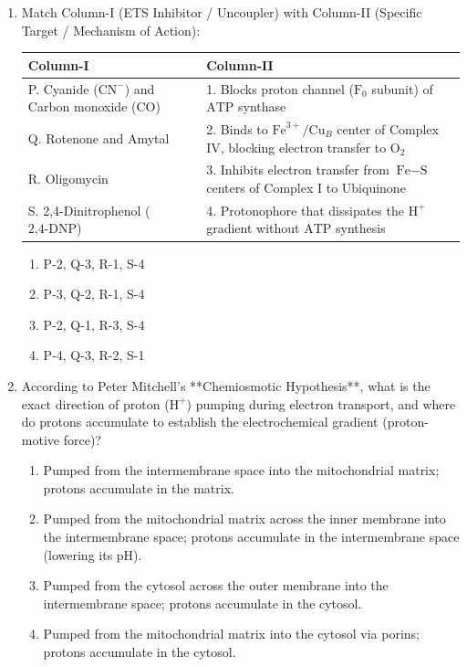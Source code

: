 \documentclass[11pt, a4paper]{article}
\begin{document}
\begin{enumerate}[label=\textbf{\arabic*.}]
\item Match Column-I (ETS Inhibitor / Uncoupler) with Column-II (Specific Target / Mechanism of Action):
\begin{center}
\begin{tabular}{|l|l|}
\hline
\textbf{Column-I} & \textbf{Column-II} \\
\hline
P. Cyanide ($\text{CN}^-$) and Carbon monoxide ($\text{CO}$) & 1. Blocks proton channel ($\text{F}_0$ subunit) of $\text{ATP}$ synthase \\
Q. Rotenone and Amytal & 2. Binds to $\text{Fe}^{3+}/\text{Cu}_B$ center of Complex IV, blocking electron transfer to $\text{O}_2$ \\
R. Oligomycin & 3. Inhibits electron transfer from $\text{Fe}-\text{S}$ centers of Complex I to Ubiquinone \\
S. 2,4-Dinitrophenol ($\text{2,4-DNP}$) & 4. Protonophore that dissipates the $\text{H}^+$ gradient without $\text{ATP}$ synthesis \\
\hline
\end{tabular}
\end{center}
\begin{enumerate}[label=(\Alph*)]
    \item P-2, Q-3, R-1, S-4
    \item P-3, Q-2, R-1, S-4
    \item P-2, Q-1, R-3, S-4
    \item P-4, Q-3, R-2, S-1
\end{enumerate}

\item According to Peter Mitchell's **Chemiosmotic Hypothesis**, what is the exact direction of proton ($\text{H}^+$) pumping during electron transport, and where do protons accumulate to establish the electrochemical gradient (proton-motive force)?
\begin{enumerate}[label=(\Alph*)]
    \item Pumped from the intermembrane space into the mitochondrial matrix; protons accumulate in the matrix.
    \item Pumped from the mitochondrial matrix across the inner membrane into the intermembrane space; protons accumulate in the intermembrane space (lowering its pH).
    \item Pumped from the cytosol across the outer membrane into the intermembrane space; protons accumulate in the cytosol.
    \item Pumped from the mitochondrial matrix into the cytosol via porins; protons accumulate in the cytosol.
\end{enumerate}


\end{enumerate}
\end{document}
